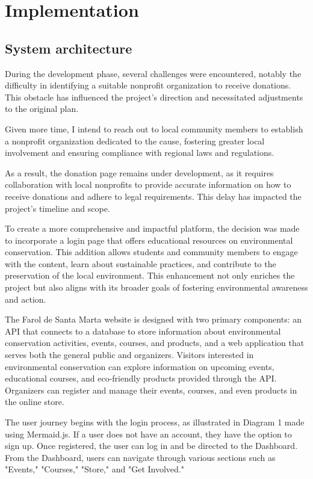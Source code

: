 \chapter{Implementation}
\label{ch:implementation}


\section{System architecture}

During the development phase, several challenges were encountered, notably the difficulty in identifying a suitable nonprofit organization to receive donations. This obstacle has influenced the project's direction and necessitated adjustments to the original plan.

Given more time, I intend to reach out to local community members to establish a nonprofit organization dedicated to the cause, fostering greater local involvement and ensuring compliance with regional laws and regulations.

As a result, the donation page remains under development, as it requires collaboration with local nonprofits to provide accurate information on how to receive donations and adhere to legal requirements. This delay has impacted the project's timeline and scope.

To create a more comprehensive and impactful platform, the decision was made to incorporate a login page that offers educational resources on environmental conservation. This addition allows students and community members to engage with the content, learn about sustainable practices, and contribute to the preservation of the local environment. This enhancement not only enriches the project but also aligns with its broader goals of fostering environmental awareness and action.

The Farol de Santa Marta website is designed with two primary components: an API that connects to a database to store information about environmental conservation activities, events, courses, and products, and a web application that serves both the general public and organizers. Visitors interested in environmental conservation can explore information on upcoming events, educational courses, and eco-friendly products provided through the API. Organizers can register and manage their events, courses, and even products in the online store.

The user journey begins with the login process, as illustrated in Diagram 1 made using Mermaid.js\cite{mermaid}. If a user does not have an account, they have the option to sign up. Once registered, the user can log in and be directed to the Dashboard. From the Dashboard, users can navigate through various sections such as "Events," "Courses," "Store," and "Get Involved." 


